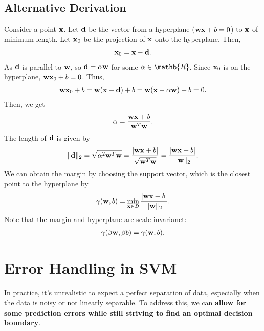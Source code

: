 \subsection{Alternative Derivation}
Consider a point ${\mathbf{x}}$. Let ${\mathbf{d}}$ be the vector from a hyperplane (\ie ${\mathbf{w}}{\mathbf{x}}+b=0$) to ${\mathbf{x}}$ of minimum length. Let ${\mathbf{x}}_0$ be the projection of ${\mathbf{x}}$ onto the hyperplane. Then, 
\begin{align*}
	{\mathbf{x}}_0 = {\mathbf{x}} - {\mathbf{d}}.
\end{align*}
As ${\mathbf{d}}$ is parallel to ${\mathbf{w}}$, so ${\mathbf{d}} = \alpha {\mathbf{w}}$ for some $\alpha\in \mathb{R}$. Since ${\mathbf{x}}_0$ is on the hyperplane, ${\mathbf{w}}{\mathbf{x}}_0 + b = 0$. Thus, 
\begin{align*}
	{\mathbf{w}}{\mathbf{x}}_0 + b = {\mathbf{w}}({\mathbf{x}}-{\mathbf{d}}) + b = {\mathbf{w}}({\mathbf{x}}-\alpha{\mathbf{w}}) + b = 0.
\end{align*}
Then, we get
\begin{align*}
	\alpha = \frac{{\mathbf{w}}{\mathbf{x}}+b}{{\mathbf{w}}^T{\mathbf{w}}}.
\end{align*}
The length of ${\mathbf{d}}$ is given by  
\begin{align*}
	\|{\mathbf{d}}\|_2 = \sqrt{\alpha^2{\mathbf{w}}^T{\mathbf{w}}} = \frac{|{\mathbf{w}}{\mathbf{x}}+b|}{\sqrt{{\mathbf{w}}^T{\mathbf{w}}}} = \frac{|{\mathbf{w}}{\mathbf{x}}+b|}{\|{\mathbf{w}}\|_2}.
\end{align*}
We can obtain the margin by choosing the support vector, which is the closest point to the hyperplane by
\begin{align*}
	\gamma({\mathbf{w}}, b) = \min_{{\mathbf{x}}\in \mathcal{D}}\frac{|{\mathbf{w}}{\mathbf{x}}+b|}{\|{\mathbf{w}}\|_2}.
\end{align*}
Note that the margin and hyperplane are scale invarianct:
\begin{align*}
	\gamma(\beta{\mathbf{w}}, \beta b) = \gamma({\mathbf{w}}, b).
\end{align*}


\section{Error Handling in SVM}
In practice, it's unrealistic to expect a perfect separation of data, especially when the data is noisy or not linearly separable. To address this, we can \textbf{allow for some prediction errors while still striving to find an optimal decision boundary}.


